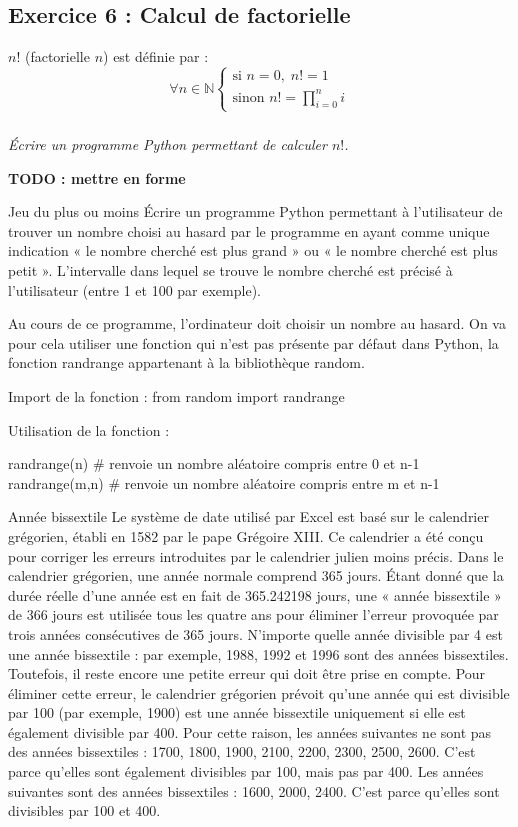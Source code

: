 \documentclass[10pt]{article}
\begin{document}
\subsection*{Exercice 6 : Calcul de factorielle}
$n!$ (factorielle $n$) est définie par :
$$
\forall n\in \mathbb{N} \left\{
\begin{array}{l}
\text{si } n=0, \; n! = 1 \\
\text{sinon } n! = \prod\limits_{i=0}^n i 
\end{array}
\right.
$$

\subparagraph*{}
\textit{Écrire un programme Python permettant de calculer $n!$.}



\newpage
\textbf{TODO : mettre en forme}

Jeu du plus ou moins
	Écrire un programme Python permettant à l’utilisateur de trouver un nombre choisi au hasard par le programme en ayant comme unique indication « le nombre cherché est plus grand » ou « le nombre cherché est plus petit ». L’intervalle dans lequel se trouve le nombre cherché est précisé à l’utilisateur (entre 1 et 100 par exemple).

Au cours de ce programme, l’ordinateur doit choisir un nombre au hasard. On va pour cela utiliser une fonction qui n’est pas présente par défaut dans Python, la fonction randrange appartenant à la bibliothèque random.

Import de la fonction :
from random import randrange

Utilisation de la fonction :
\begin{python}
randrange(n) # renvoie un nombre aléatoire compris entre 0 et n-1
randrange(m,n) # renvoie un nombre aléatoire compris entre m et n-1
\end{python}

Année bissextile
Le système de date utilisé par Excel est basé sur le calendrier grégorien, établi en 1582 par le pape Grégoire XIII. Ce calendrier a été conçu pour corriger les erreurs introduites par le calendrier julien moins précis.
Dans le calendrier grégorien, une année normale comprend 365 jours. Étant donné que la durée réelle d'une année est en fait de 365.242198 jours, une « année bissextile » de 366 jours est utilisée tous les quatre ans pour éliminer l'erreur provoquée par trois années consécutives de 365 jours. N'importe quelle année divisible par 4 est une année bissextile : par exemple, 1988, 1992 et 1996 sont des années bissextiles.
Toutefois, il reste encore une petite erreur qui doit être prise en compte. Pour éliminer cette erreur, le calendrier grégorien prévoit qu'une année qui est divisible par 100 (par exemple, 1900) est une année bissextile uniquement si elle est également divisible par 400.
Pour cette raison, les années suivantes ne sont pas des années bissextiles : 1700, 1800, 1900, 2100, 2200, 2300, 2500, 2600. C'est parce qu'elles sont également divisibles par 100, mais pas par 400. 
Les années suivantes sont des années bissextiles : 1600, 2000, 2400. C'est parce qu'elles sont divisibles par 100 et 400.
\end{document}
